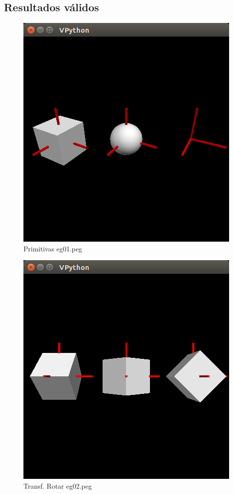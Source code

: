 \documentclass[10pt,a4paper]{article}
\begin{document}
\subsection{Resultados válidos}
\begin{figure}[H]
\centering
\includegraphics[scale=0.3]{eg01.png}
\caption{Primitivas eg01.peg}
\end{figure}
\begin{figure}[H]
\centering
\includegraphics[scale=0.3]{eg02.png}
\caption{Transf. Rotar eg02.peg}
\end{figure}
\end{document}
